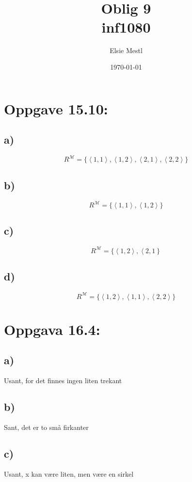 \documentclass[a4paper, norsk, 10pt]{article}
\date{\today}
\title{Oblig 9 \\ inf1080}
\author{Elsie Mestl}
\begin{document}
\maketitle
\begin{flushleft}

  \section*{Oppgave 15.10:}
  \subsection*{a)}

  \[R^{\mathcal{M}} = \{\left<1 ,1 \right>, \left<1 ,2 \right>, \left<2 ,1 \right>, \left<2 ,2 \right>\}\]
  
  \subsection*{b)}

  \[R^{\mathcal{M}} = \{\left<1 ,1 \right>, \left<1 ,2 \right>\}\]

  
  \subsection*{c)}

  \[R^{\mathcal{M}} = \{\left<1 ,2 \right>, \left<2,1\right \}\]

  \subsection*{d)}
  
  \[R^{\mathcal{M}} = \{\left<1 ,2 \right>, \left<1 ,1 \right>, \left<2 ,2 \right>\}\]

  
  \section*{Oppgava 16.4:}
  
  \subsection*{a)}
  Usant, for det finnes ingen liten trekant
  
  \subsection*{b)}
  Sant, det er to små firkanter
  
  \subsection*{c)}
  Usant, x kan være liten, men være en sirkel
  

\end{flushleft}
\end{document}
